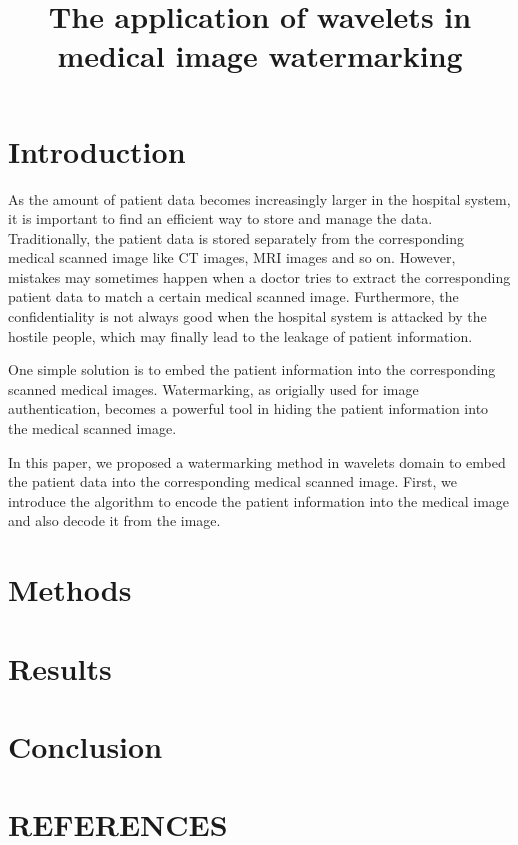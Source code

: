 \documentclass{article}
\title{The application of wavelets in medical image watermarking}
\begin{document}
%
\maketitle
%
\begin{abstract}

\end{abstract}
%

\section{Introduction}
As the amount of patient data becomes increasingly larger in the hospital system, it is important to find an efficient way to store and manage the data. Traditionally, the patient data is stored separately from the corresponding medical scanned image like CT images, MRI images and so on. However, mistakes may sometimes happen when a doctor tries to extract the corresponding patient data to match a certain medical scanned image. Furthermore, the confidentiality is not always good when the hospital system is attacked by the hostile people, which may finally lead to the leakage of patient information.

One simple solution is to embed the patient information into the corresponding scanned medical images. Watermarking, as origially used for image authentication, becomes a powerful tool in hiding the patient information into the medical scanned image. 

In this paper, we proposed a watermarking method in wavelets domain to embed the patient data into the corresponding medical scanned image. First, we introduce the algorithm to encode the patient information into the medical image and also decode it from the image.

\section{Methods}

\section{Results}

\section{Conclusion}

\section{REFERENCES}
\label{sec:ref}




\end{document}
